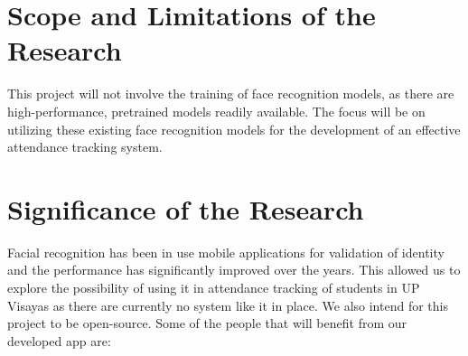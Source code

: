 \section{Scope and Limitations of the Research}
\label{sec:scopelimitations}

This project will not involve the training of face recognition models, as there are high-performance, pretrained models readily available. The focus will be on utilizing these existing face recognition models for the development of an effective attendance tracking system.

\begin{comment}
	This section discusses the boundaries (with respect to the objectives) of the research and the constraints within 
	which the research will be developed.
\end{comment}

\begin{comment}

%
%
Generally, one paragraph should be allotted for each of your research objectives.

Each paragraph contains a brief overview of the concept/theory and the purpose of doing the associated objective.

Each paragraph also includes a description of the scope/limitation of your study.

* Please refer to the slides for examples.

\end{comment}


\section{Significance of the Research}
\label{sec:significance}

	Facial recognition has been in use mobile applications for validation of identity and the performance has significantly improved over the years. This allowed us to explore the possibility of using it in attendance tracking of students in UP Visayas as there are currently no system like it in place. We also intend for this project to be open-source. Some of the people that will benefit from our developed app are:
	
